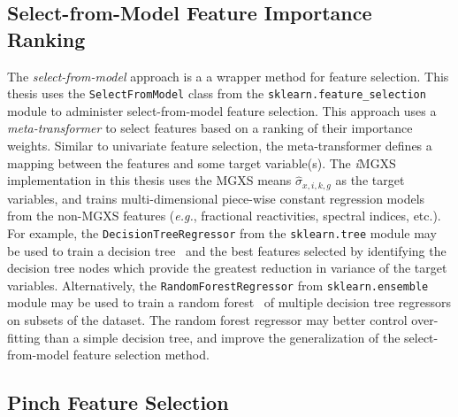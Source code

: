 \subsection{Select-from-Model Feature Importance Ranking}
\label{subsec:chap10-select-from-model}

The \textit{select-from-model} approach is a a wrapper method for feature selection. This thesis uses the \texttt{SelectFromModel} class from the \texttt{sklearn.feature_selection} module to administer select-from-model feature selection. This approach uses a \textit{meta-transformer} to select features based on a ranking of their importance weights. Similar to univariate feature selection, the meta-transformer defines a mapping between the features and some target variable(s). The \textit{i}\ac{MGXS} implementation in this thesis uses the \ac{MGXS} means $\hat{\sigma}_{x,i,k,g}$ as the target variables, and trains multi-dimensional piece-wise constant regression models from the non-\ac{MGXS} features (\textit{e.g.}, fractional reactivities, spectral indices, etc.). For example, the \texttt{DecisionTreeRegressor} from the \texttt{sklearn.tree} module may be used to train a decision tree~\cite{breiman1984tree} and the best features selected by identifying the decision tree nodes which provide the greatest reduction in variance of the target variables. Alternatively, the \texttt{RandomForestRegressor} from \texttt{sklearn.ensemble} module may be used to train a random forest~\cite{ho1998forest} of multiple decision tree regressors on subsets of the dataset. The random forest regressor may better control over-fitting than a simple decision tree, and improve the generalization of the select-from-model feature selection method.

\subsection{Pinch Feature Selection}
\label{subsec:chap10-pinch-selection}

